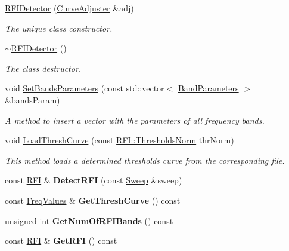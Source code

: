 \begin{DoxyCompactItemize}
\item 
\hyperlink{classRFIDetector_a1943c00a5ab657a24cdacaf2b0d550f1}{R\+F\+I\+Detector} (\hyperlink{classCurveAdjuster}{Curve\+Adjuster} \&adj)
\begin{DoxyCompactList}\small\item\em The unique class constructor. \end{DoxyCompactList}\item 
\hyperlink{classRFIDetector_a6445cd27f7b22459d8f1e3b67c323cf0}{$\sim$\+R\+F\+I\+Detector} ()
\begin{DoxyCompactList}\small\item\em The class destructor. \end{DoxyCompactList}\item 
\mbox{\label{classRFIDetector_aea149c6aa9fa7db44616973b27863ebc}} 
void \hyperlink{classRFIDetector_aea149c6aa9fa7db44616973b27863ebc}{Set\+Bands\+Parameters} (const std\+::vector$<$ \hyperlink{structBandParameters}{Band\+Parameters} $>$ \&bands\+Param)
\begin{DoxyCompactList}\small\item\em A method to insert a vector with the parameters of all frequency bands. \end{DoxyCompactList}\item 
void \hyperlink{classRFIDetector_a1eba12febd92bba77f658dfe664ea5c6}{Load\+Thresh\+Curve} (const \hyperlink{structRFI_a18cfa7d24274bbcd14acc6b513860cb0}{R\+F\+I\+::\+Thresholds\+Norm} thr\+Norm)
\begin{DoxyCompactList}\small\item\em This method loads a determined thresholds curve from the corresponding file. \end{DoxyCompactList}\item 
\mbox{\label{classRFIDetector_a98bf817b6c6aee954e0f0056fb5e4360}} 
const \hyperlink{structRFI}{R\+FI} \& {\bfseries Detect\+R\+FI} (const \hyperlink{structSweep}{Sweep} \&sweep)
\item 
\mbox{\label{classRFIDetector_a6e2c5fbdb76bc7b752fb0fec3bc4f41c}} 
const \hyperlink{structFreqValues}{Freq\+Values} \& {\bfseries Get\+Thresh\+Curve} () const
\item 
\mbox{\label{classRFIDetector_a053ba4f21411a8671ff0a38f2a18d393}} 
unsigned int {\bfseries Get\+Num\+Of\+R\+F\+I\+Bands} () const
\item 
\mbox{\label{classRFIDetector_ad50815b6e1004d2a6c15aef7deaca272}} 
const \hyperlink{structRFI}{R\+FI} \& {\bfseries Get\+R\+FI} () const
\end{DoxyCompactItemize}


